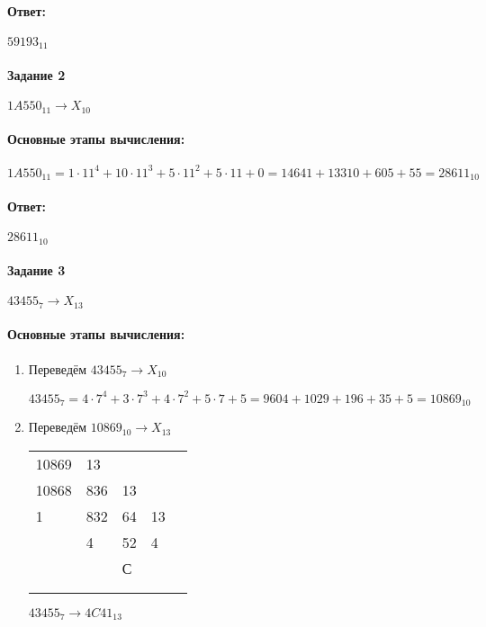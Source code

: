 \paragraph{Ответ:}
$59193_{11}$
\paragraph{Задание 2}
$1A550_{11} \rightarrow X_{10}$
\paragraph{Основные этапы вычисления:}
\hfill \break
\hfill \break
$1A550_{11}=1\cdot 11^4 + 10\cdot 11^3 +5\cdot 11^2 + 5\cdot11+0=14641+13310+605+55=28611_{10}$

\paragraph{Ответ:}
$28611_{10}$

\paragraph{Задание 3}
$43455_{7} \rightarrow X_{13}$

\paragraph{Основные этапы вычисления:}

\begin{enumerate}
\item Переведём $43455_{7} \rightarrow X_{10}$

$43455_{7} = 4\cdot7^4 + 3\cdot 7^3 + 4\cdot 7^2 + 5\cdot7+5=9604+1029+196+35+5=10869_{10}$

\item Переведём $10869_{10} \rightarrow X_{13}$

\FloatBarrier
\begin{table}
\centering
\begin{tabular}{lllll}
\multicolumn{1}{l|}{10869} & 13                       &                         &    &   \\ 
\cline{2-2}
\multicolumn{1}{l|}{10868} & \multicolumn{1}{l|}{836} & 13                      &    &   \\ 
\cline{1-1}\cline{3-3}
1                          & \multicolumn{1}{l|}{832} & \multicolumn{1}{l|}{64} & 13 &   \\ 
\cline{2-2}\cline{4-4}
                           & 4                        & \multicolumn{1}{l|}{52} & 4  &   \\ 
\cline{3-3}
                           &                          & С                       &    &   \\
                           &                          &                         &    &   \\
                           &                          &                         &    &  
\end{tabular}
\end{table}
\FloatBarrier
$43455_{7} \rightarrow 4C41_{13}$
\end{enumerate}

